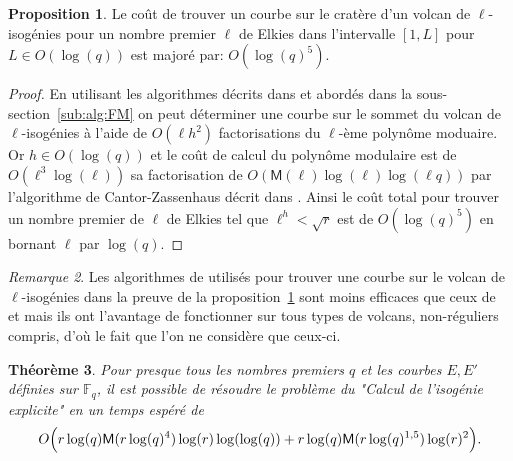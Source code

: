 \documentclass[10pt,a4paper]{book}
\theoremstyle{plain}
\newtheorem{thm}{Théorème}[chapter]
\theoremstyle{definition}
\theoremstyle{definition}
\theoremstyle{definition}
\newtheorem{prop}[thm]{Proposition}
\theoremstyle{definition}
\theoremstyle{remark}
\newtheorem{rem}[thm]{Remarque}
\theoremstyle{remark}
\theoremstyle{definition}
\begin{document}
\begin{prop}
\label{pro:cou:dec}
Le coût de trouver un courbe sur le cratère d'un volcan de $\ell$-isogénies 
pour un nombre premier $\ell$ de Elkies dans l'intervalle $[1,L]$ 
pour $L \in O(\log(q))$ est majoré par:
$O(\log(q)^5)$.
\end{prop}

\begin{proof}
En utilisant les algorithmes décrits dans \cite{FouquetMorain02} et abordés 
dans la sous-section~\ref{sub:alg:FM} on peut déterminer une courbe sur le 
sommet du volcan de $\ell$-isogénies à l'aide de $O(\ell h^2)$ 
  factorisations du $\ell$-ème polynôme moduaire. Or $h \in O(\log(q))$ et
  le coût de calcul du polynôme modulaire est de $O(\ell^3\log(\ell))$ sa factorisation de 
  $O(\mathsf{M}(\ell)\log(\ell)\log(\ell q))$ par l'algorithme de 
  Cantor-Zassenhaus décrit dans \cite[Chapter~14.5]{vzGJG03}. Ainsi le coût 
  total pour trouver un nombre premier de $\ell$ de Elkies tel que $\ell^h<\sqrt{r}$  est de
  $O(\log(q)^5)$ en bornant $\ell$ par $\log(q)$.
	
\end{proof}

\begin{rem}
Les algorithmes de \cite{FouquetMorain02} utilisés pour trouver une courbe sur 
le volcan de $\ell$-isogénies  dans la preuve de la 
proposition~\ref{pro:cou:dec} sont moins efficaces que ceux de 
\cite{Ionica-Joux10} et \cite{MiretMRV05} mais ils ont l'avantage de 
fonctionner sur tous types de volcans, non-réguliers compris, d'où le fait que
l'on ne considère que ceux-ci.
\end{rem}


\begin{thm}
Pour presque tous les nombres premiers $q$ et les courbes $E,E'$ définies sur 
$\mathbb{F}_q$, il est possible de résoudre le problème du "Calcul de l'isogénie explicite" 
en un temps espéré de   \[
O\Bigl( r \log(q) \mathsf{M}(r \log(q)^4) \log(r) \log(\log(q)) +  r\log(q) \mathsf{M}(r \log(q)^{1,5}) \log(r)^2 \Bigr).
 \]
\end{thm}
\end{document}
